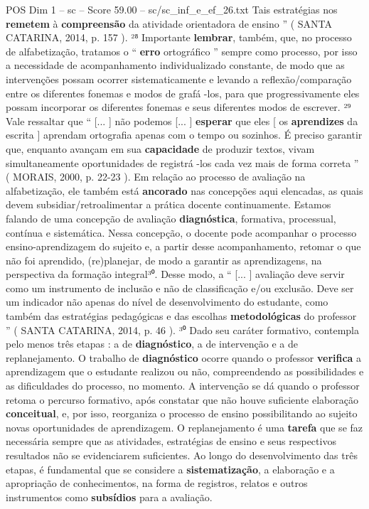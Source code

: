 \begin{textsample}{POS Dim 1 – sc – Score 59.00 – sc/sc\_inf\_e\_ef\_26.txt}
Tais estratégias nos \textbf{remetem} à \textbf{compreensão} da atividade orientadora de ensino ” ( SANTA CATARINA, 2014, p. 157 ). ²⁸ Importante \textbf{lembrar}, também, que, no processo de alfabetização, tratamos o “ \textbf{erro} ortográfico ” sempre como processo, por isso a necessidade de acompanhamento individualizado constante, de modo que as intervenções possam ocorrer sistematicamente e levando a reflexão/comparação entre os diferentes fonemas e modos de grafá -los, para que progressivamente eles possam incorporar os diferentes fonemas e seus diferentes modos de escrever. ²⁹ Vale ressaltar que “ [... ] não podemos [... ] \textbf{esperar} que eles [ os \textbf{aprendizes} da escrita ] aprendam ortografia apenas com o tempo ou sozinhos.
É preciso garantir que, enquanto avançam em sua \textbf{capacidade} de produzir textos, vivam simultaneamente oportunidades de registrá -los cada vez mais de forma correta ” ( MORAIS, 2000, p. 22-23 ).
Em relação ao processo de avaliação na alfabetização, ele também está \textbf{ancorado} nas concepções aqui elencadas, as quais devem subsidiar/retroalimentar a prática docente continuamente.
Estamos falando de uma concepção de avaliação \textbf{diagnóstica}, formativa, processual, contínua e sistemática.
Nessa concepção, o docente pode acompanhar o processo ensino-aprendizagem do sujeito e, a partir desse acompanhamento, retomar o que não foi aprendido, (re)planejar, de modo a garantir as aprendizagens, na perspectiva da formação integral³⁰.
Desse modo, a “ [... ] avaliação deve servir como um instrumento de inclusão e não de classificação e/ou exclusão.
Deve ser um indicador não apenas do nível de desenvolvimento do estudante, como também das estratégias pedagógicas e das escolhas \textbf{metodológicas} do professor ” ( SANTA CATARINA, 2014, p. 46 ). ³⁰ Dado seu caráter formativo, contempla pelo menos três etapas : a de \textbf{diagnóstico}, a de intervenção e a de replanejamento.
O trabalho de \textbf{diagnóstico} ocorre quando o professor \textbf{verifica} a aprendizagem que o estudante realizou ou não, compreendendo as possibilidades e as dificuldades do processo, no momento.
A intervenção se dá quando o professor retoma o percurso formativo, após constatar que não houve suficiente elaboração \textbf{conceitual}, e, por isso, reorganiza o processo de ensino possibilitando ao sujeito novas oportunidades de aprendizagem.
O replanejamento é uma \textbf{tarefa} que se faz necessária sempre que as atividades, estratégias de ensino e seus respectivos resultados não se evidenciarem suficientes.
Ao longo do desenvolvimento das três etapas, é fundamental que se considere a \textbf{sistematização}, a elaboração e a apropriação de conhecimentos, na forma de registros, relatos e outros instrumentos como \textbf{subsídios} para a avaliação.

\end{textsample}
